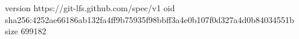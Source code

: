 version https://git-lfs.github.com/spec/v1
oid sha256:4252ae66186ab132fa4ff9b75935f98bbff3a4e0b107f0d327a4d0b84034551b
size 699182
